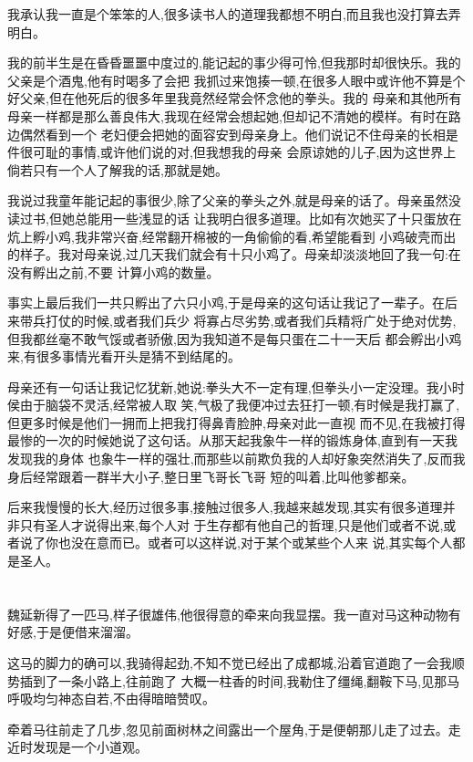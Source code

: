 ﻿\documentclass[12pt,twocolumn]{article}
\begin{document}
我承认我一直是个笨笨的人,很多读书人的道理我都想不明白,而且我也没打算去弄明白。

我的前半生是在昏昏噩噩中度过的,能记起的事少得可怜,但我那时却很快乐。我的父亲是个酒鬼,他有时喝多了会把
我抓过来饱揍一顿,在很多人眼中或许他不算是个好父亲,但在他死后的很多年里我竟然经常会怀念他的拳头。我的
母亲和其他所有母亲一样都是那么善良伟大,我现在经常会想起她,但却记不清她的模样。有时在路边偶然看到一个
老妇便会把她的面容安到母亲身上。他们说记不住母亲的长相是件很可耻的事情,或许他们说的对,但我想我的母亲
会原谅她的儿子,因为这世界上倘若只有一个人了解我的话,那就是她。

我说过我童年能记起的事很少,除了父亲的拳头之外,就是母亲的话了。母亲虽然没读过书,但她总能用一些浅显的话
让我明白很多道理。比如有次她买了十只蛋放在炕上孵小鸡,我非常兴奋,经常翻开棉被的一角偷偷的看,希望能看到
小鸡破壳而出的样子。我对母亲说,过几天我们就会有十只小鸡了。母亲却淡淡地回了我一句:在没有孵出之前,不要
计算小鸡的数量。

事实上最后我们一共只孵出了六只小鸡,于是母亲的这句话让我记了一辈子。在后来带兵打仗的时候,或者我们兵少
将寡占尽劣势,或者我们兵精将广处于绝对优势,但我都丝毫不敢气馁或者骄傲,因为我知道不是每只蛋在二十一天后
都会孵出小鸡来,有很多事情光看开头是猜不到结尾的。

母亲还有一句话让我记忆犹新,她说:拳头大不一定有理,但拳头小一定没理。我小时侯由于脑袋不灵活,经常被人取
笑,气极了我便冲过去狂打一顿,有时候是我打赢了,但更多时候是他们一拥而上把我打得鼻青脸肿,母亲对此一直视
而不见,在我被打得最惨的一次的时候她说了这句话。从那天起我象牛一样的锻炼身体,直到有一天我发现我的身体
也象牛一样的强壮,而那些以前欺负我的人却好象突然消失了,反而我身后经常跟着一群半大小子,整日里飞哥长飞哥
短的叫着,比叫他爹都亲。

后来我慢慢的长大,经历过很多事,接触过很多人,我越来越发现,其实有很多道理并非只有圣人才说得出来,每个人对
于生存都有他自己的哲理,只是他们或者不说,或者说了你也没在意而已。或者可以这样说,对于某个或某些个人来
说,其实每个人都是圣人。

\section{}

魏延新得了一匹马,样子很雄伟,他很得意的牵来向我显摆。我一直对马这种动物有好感,于是便借来溜溜。

这马的脚力的确可以,我骑得起劲,不知不觉已经出了成都城,沿着官道跑了一会我顺势插到了一条小路上,往前跑了
大概一柱香的时间,我勒住了缰绳,翻鞍下马,见那马呼吸均匀神态自若,不由得暗暗赞叹。

牵着马往前走了几步,忽见前面树林之间露出一个屋角,于是便朝那儿走了过去。走近时发现是一个小道观。
\end{document}
